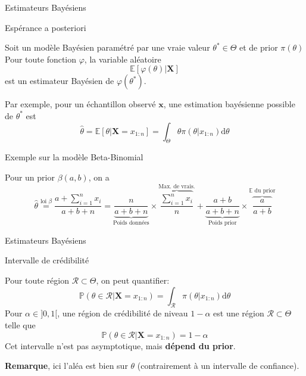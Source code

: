 \documentclass[9pt,ignorenonframetext,]{beamer}
\begin{document}
\begin{frame}{Estimateurs Bayésiens}
\protect\hypertarget{estimateurs-bayuxe9siens-1}{}

\begin{block}{Espérance a posteriori}

Soit un modèle Bayésien paramétré par une vraie valeur
\(\theta^* \in \Theta\) et de prior \(\pi(\theta)\) Pour toute fonction
\(\varphi\), la variable aléatoire
\[\mathbb{E}[\varphi(\theta) \vert \mathbf{X}]\] est un estimateur
Bayésien de \(\varphi(\theta^*)\). \pause

Par exemple, pour un échantillon observé \(\mathbf{x}\), une estimation
bayésienne possible de \(\theta^*\) est
\[\hat{\theta} = \mathbb{E}[\theta \vert \mathbf{X} = x_{1:n}] = \int_\Theta \theta \pi(\theta \vert x_{1:n}) \text{d}\theta\]

\end{block}

\begin{block}{Exemple sur la modèle Beta-Binomial}

Pour un prior \(\beta(a, b)\), on a
\[\hat{\theta} \overset{\text{loi } \beta}{=} \frac{a + \sum_{i = 1}^n x_i}{a + b + n} = \underbrace{\frac{n}{a + b + n}}_{\text{Poids données}}\times \overbrace{\frac{\sum_{i=1}^n x_i}{n}}^{\text{Max. de vrais.}} + \underbrace{\frac{a + b}{a + b + n}}_{\text{Poids prior}} \times \overbrace{\frac{a}{a + b}}^{\mathbb{E}\text{ du prior}}\]

\end{block}

\end{frame}

\begin{frame}{Estimateurs Bayésiens}
\protect\hypertarget{estimateurs-bayuxe9siens-2}{}

\begin{block}{Intervalle de crédibilité}

Pour toute région \(\mathcal{R} \subset \Theta\), on peut quantifier:
\[\mathbb{P}(\theta \in \mathcal{R} \vert  \mathbf{X} = x_{1:n}) = \int_\mathcal{R} \pi(\theta \vert x_{1:n}) \text{d}\theta\]
Pour \(\alpha \in ]0, 1[\), une région de crédibilité de niveau
\(1-\alpha\) est une région \(\mathcal{R} \subset \Theta\) telle que
\[\mathbb{P}(\theta \in \mathcal{R} \vert  \mathbf{X} = x_{1:n}) = 1 - \alpha\]
Cet intervalle n'est pas asymptotique, mais \textbf{dépend du prior}.

\textbf{Remarque}, ici l'aléa est bien sur \(\theta\) (contrairement à
un intervalle de confiance).

\end{block}

\end{frame}
\end{document}
